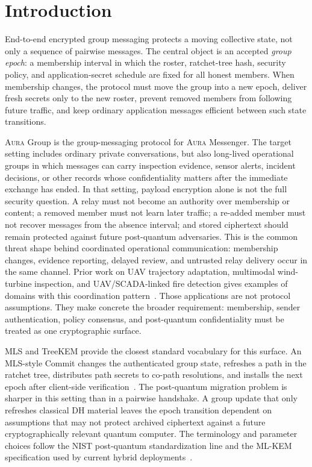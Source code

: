 \documentclass[preprint,12pt]{elsarticle}
\theoremstyle{definition}
\newcommand{\tech}[1]{\textnormal{#1}}
\newcommand{\Aura}{\textsc{Aura}}
\newcommand{\MLS}{\tech{MLS}}
\newcommand{\TreeKEM}{\tech{TreeKEM}}
\begin{document}
\section{Introduction}

End-to-end encrypted group messaging protects a moving collective state, not
only a sequence of pairwise messages. The central object is an accepted
\emph{group epoch}: a membership interval in which the roster, ratchet-tree
hash, security policy, and application-secret schedule are fixed for all
honest members. When membership changes, the protocol must move the group into
a new epoch, deliver fresh secrets only to the new roster, prevent removed
members from following future traffic, and keep ordinary application messages
efficient between such state transitions.

\Aura{} Group is the group-messaging protocol for \Aura{} Messenger. The
target setting includes ordinary private conversations, but also long-lived
operational groups in which messages can carry inspection evidence, sensor
alerts, incident decisions, or other records whose confidentiality matters
after the immediate exchange has ended. In that setting, payload encryption
alone is not the full security question. A relay must not become an authority
over membership or content; a removed member must not learn later traffic; a
re-added member must not recover messages from the absence interval; and
stored ciphertext should remain protected against future post-quantum
adversaries. This is the common threat shape behind coordinated operational
communication: membership changes, evidence reporting, delayed review, and
untrusted relay delivery occur in the same channel. Prior work on UAV
trajectory adaptation, multimodal wind-turbine inspection, and
UAV/SCADA-linked fire detection gives examples of domains with this
coordination pattern~\cite{svystun2025dytam,svystun2024thermal,lysyi2025fire}.
Those applications are not protocol assumptions. They make concrete the
broader requirement: membership, sender authentication, policy consensus, and
post-quantum confidentiality must be treated as one cryptographic surface.

\MLS{} and \TreeKEM{} provide the closest standard vocabulary for this surface.
An MLS-style Commit changes the authenticated group state, refreshes a path in
the ratchet tree, distributes path secrets to co-path resolutions, and installs
the next epoch after client-side verification~\cite{rfc9420,treekem,treesync}.
The post-quantum migration problem is sharper in this setting than in a
pairwise handshake. A group update that only refreshes classical DH material
leaves the epoch transition dependent on assumptions that may not protect
archived ciphertext against a future cryptographically relevant quantum
computer. The terminology and parameter choices follow the NIST post-quantum
standardization line and the ML-KEM specification used by current hybrid
deployments~\cite{nist-pqc,fips203}.
\end{document}
